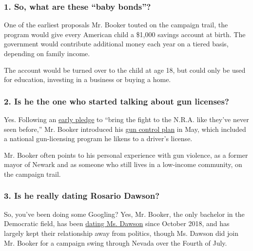 \hypertarget{1-so-what-are-these-baby-bonds}{%
\subsubsection{\texorpdfstring{\textbf{1. So, what are these ``baby
bonds''?}}{1. So, what are these ``baby bonds''?}}\label{1-so-what-are-these-baby-bonds}}

One of the earliest proposals Mr. Booker touted on the campaign trail,
the program would give every American child a \$1,000 savings account at
birth. The government would contribute additional money each year on a
tiered basis, depending on family income.

The account would be turned over to the child at age 18, but could only
be used for education, investing in a business or buying a home.

\hypertarget{2-is-he-the-one-who-started-talking-about-gun-licenses}{%
\subsubsection{\texorpdfstring{\textbf{2. Is he the one who started
talking about gun
licenses?}}{2. Is he the one who started talking about gun licenses?}}\label{2-is-he-the-one-who-started-talking-about-gun-licenses}}

Yes. Following an
\href{https://www.concordmonitor.com/Bringing-the-fight-to-the-NRA-25466409}{early
pledge} to ``bring the fight to the N.R.A. like they've never seen
before,'' Mr. Booker introduced his
\href{https://www.nytimes.com/2019/05/06/us/politics/cory-booker-gun-control.html}{gun
control plan} in May, which included a national gun-licensing program he
likens to a driver's license.

Mr. Booker often points to his personal experience with gun violence, as
a former mayor of Newark and as someone who still lives in a low-income
community, on the campaign trail.

\hypertarget{3-is-he-really-dating-rosario-dawson}{%
\subsubsection{\texorpdfstring{\textbf{3. Is he really dating Rosario
Dawson?}}{3. Is he really dating Rosario Dawson?}}\label{3-is-he-really-dating-rosario-dawson}}

So, you've been doing some Googling? Yes, Mr. Booker, the only bachelor
in the Democratic field, has been
\href{https://www.nytimes.com/2019/03/14/us/politics/cory-booker-rosario-dawson.html}{dating
Ms. Dawson} since October 2018, and has largely kept their relationship
away from politics, though Ms. Dawson did join Mr. Booker for a campaign
swing through Nevada over the Fourth of July.

